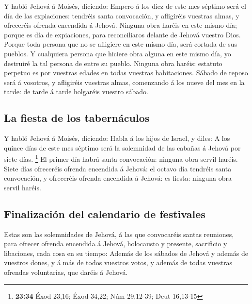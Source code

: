 Y habló Jehová á Moisés, diciendo:  Empero á
los diez de este mes séptimo será el día de las expiaciones: tendréis
santa convocación, y afligiréis vuestras almas, y ofreceréis ofrenda
encendida á Jehová.  Ninguna obra haréis en este mismo día;
porque es día de expiaciones, para reconciliaros delante de Jehová
vuestro Dios.  Porque toda persona que no se afligiere en
este mismo día, será cortada de sus pueblos.  Y cualquiera
persona que hiciere obra alguna en este mismo día, yo destruiré la tal
persona de entre su pueblo.  Ninguna obra haréis: estatuto
perpetuo es por vuestras edades en todas vuestras habitaciones.
 Sábado de reposo será á vosotros, y afligiréis vuestras
almas, comenzando á los nueve del mes en la tarde: de tarde á tarde
holgaréis vuestro sábado.

\hypertarget{la-fiesta-de-los-tabernuxe1culos}{%
\subsection{La fiesta de los
tabernáculos}\label{la-fiesta-de-los-tabernuxe1culos}}

 Y habló Jehová á Moisés, diciendo:  Habla á
los hijos de Israel, y diles: A los quince días de este mes séptimo será
la solemnidad de las cabañas á Jehová por siete días. \footnote{\textbf{23:34}
  Éxod 23,16; Éxod 34,22; Núm 29,12-39; Deut 16,13-15}  El
primer día habrá santa convocación: ninguna obra servil haréis.
 Siete días ofreceréis ofrenda encendida á Jehová: el
octavo día tendréis santa convocación, y ofreceréis ofrenda encendida á
Jehová: es fiesta: ninguna obra servil haréis.

\hypertarget{finalizaciuxf3n-del-calendario-de-festivales}{%
\subsection{Finalización del calendario de
festivales}\label{finalizaciuxf3n-del-calendario-de-festivales}}

 Estas son las solemnidades de Jehová, á las que
convocaréis santas reuniones, para ofrecer ofrenda encendida á Jehová,
holocausto y presente, sacrificio y libaciones, cada cosa en su tiempo:
 Además de los sábados de Jehová y además de vuestros
dones, y á más de todos vuestros votos, y además de todas vuestras
ofrendas voluntarias, que daréis á Jehová.

